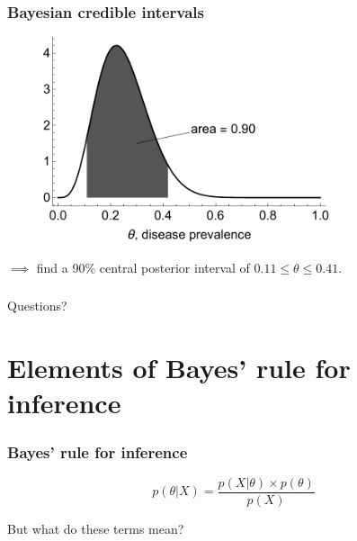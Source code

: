 \documentclass[handout]{beamer}
\begin{document}
\begin{frame}
	\frametitle{Bayesian credible intervals}
	
	\begin{figure}[ht]
		\centerline{\includegraphics[width=0.75\textwidth]{figures/binomial_credible_interval.pdf}}
	\end{figure}
	
	$\implies$ find a 90\% central posterior interval of $0.11\leq\theta\leq 0.41$.
	
\end{frame}

\begin{frame}
	\frametitle{}
	{\Huge Questions?}
\end{frame}

\section{Elements of Bayes' rule for inference}
\frame{\tableofcontents[currentsection]}

\begin{frame}
	\frametitle{Bayes' rule for inference}
	
	
	\begin{equation}
	p(\theta|X) = \frac{p(X|\theta)\times p(\theta)}{p(X)}
	\end{equation}
	
	But what do these terms mean?
	
\end{frame}
\end{document}
